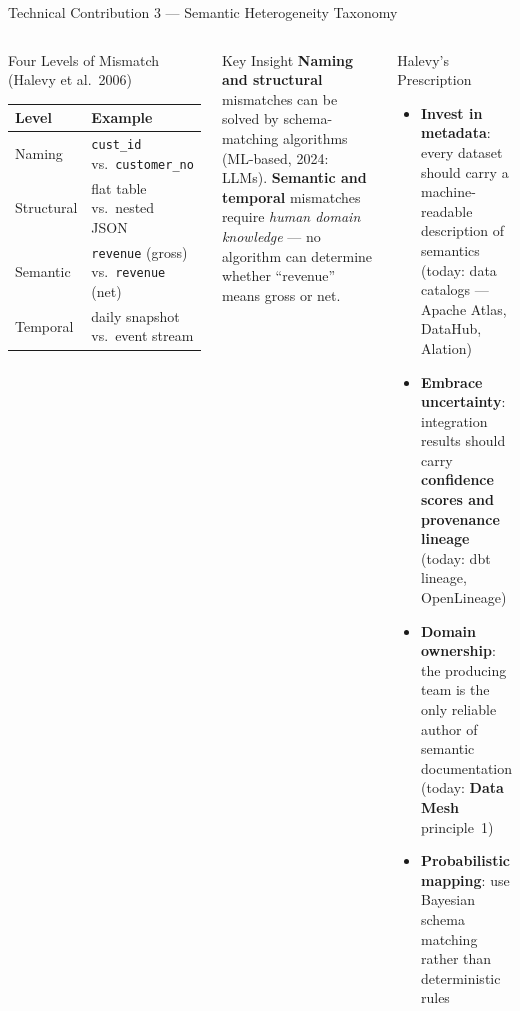 \documentclass[aspectratio=169,10pt]{beamer}
\begin{document}
\begin{frame}{Technical Contribution 3 — Semantic Heterogeneity Taxonomy}
  \begin{columns}[T]
      \begin{block}{Four Levels of Mismatch (Halevy et al.\ 2006)}
        \renewcommand{\arraystretch}{1.25}
        \begin{tabular}{@{}p{2.0cm}p{4.0cm}@{}}
          \toprule
          \textbf{Level} & \textbf{Example} \\
          \midrule
          Naming     & \texttt{cust\_id} vs.\ \texttt{customer\_no} \\
          Structural  & flat table vs.\ nested JSON \\
          Semantic    & \texttt{revenue} (gross) vs.\ \texttt{revenue} (net) \\
          Temporal    & daily snapshot vs.\ event stream \\
          \bottomrule
        \end{tabular}
      \end{block}
      \vspace{5pt}
      \begin{alertblock}{Key Insight}
        \textbf{Naming and structural} mismatches can be solved by
        schema-matching algorithms (ML-based, 2024: LLMs).
        \textbf{Semantic and temporal} mismatches require \emph{human
        domain knowledge} — no algorithm can determine whether
        ``revenue'' means gross or net.
      \end{alertblock}

      \begin{block}{Halevy's Prescription}
        \begin{itemize}
          \item \textbf{Invest in metadata}: every dataset should carry
                a machine-readable description of semantics
                (today: data catalogs — Apache Atlas, DataHub, Alation)
          \item \textbf{Embrace uncertainty}: integration results should
                carry \textbf{confidence scores and provenance lineage}
                (today: dbt lineage, OpenLineage)
          \item \textbf{Domain ownership}: the producing team is the
                only reliable author of semantic documentation
                (today: \textbf{Data Mesh} principle~1)
          \item \textbf{Probabilistic mapping}: use Bayesian schema
                matching rather than deterministic rules
        \end{itemize}
      \end{block}
  \end{columns}
\end{frame}
\end{document}
